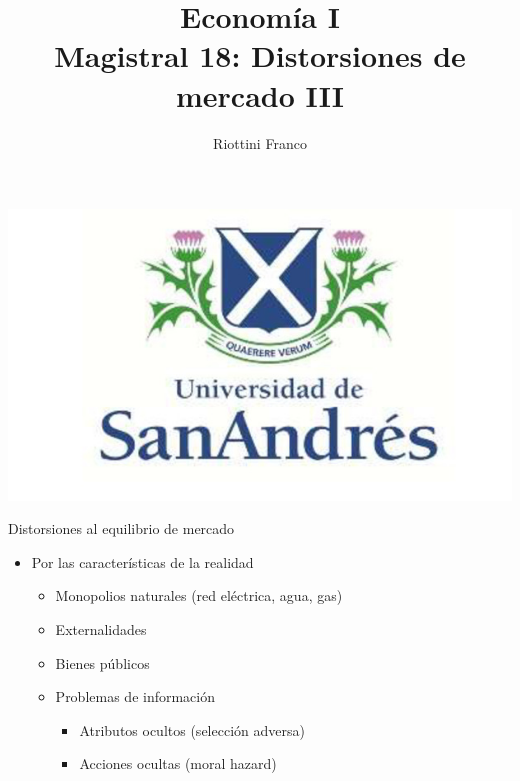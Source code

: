 \documentclass{beamer}
\title[Economía I]{Economía I \vspace{4mm}
\\ Magistral 18: Distorsiones de mercado III}
\date{}
\author[Franco Riottini]{Riottini Franco}
\institute[]{Universidad de San Andrés}
\begin{document}
\begin{frame}
\titlepage
\centering
\includegraphics[scale=0.2]{../Figures/logoUDESA.jpg} 
\end{frame}

\begin{frame}{Distorsiones al equilibrio de mercado}
    \begin{itemize}
        \item Por las características de la realidad \vspace{1mm}
        \begin{itemize}
            \item Monopolios naturales (red eléctrica, agua, gas)   
             \vspace{1mm}
            \item Externalidades
             \vspace{1mm}
            \item Bienes públicos
            \vspace{1mm}
            \item Problemas de información
            \begin{itemize}
                \item Atributos ocultos (selección adversa)
                 \vspace{1mm}
                \item Acciones ocultas (moral hazard)
            \end{itemize}        
        \end{itemize}
    \end{itemize}
\end{frame}
\end{document}
